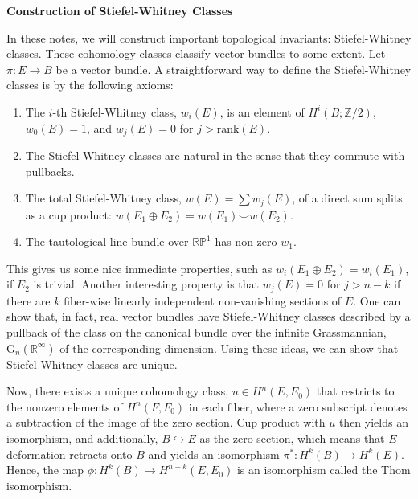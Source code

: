 \documentclass[12pt]{book}
\theoremstyle{definition}
\theoremstyle{remark}
\newcommand{\BR}{\mathbb R}
\newcommand{\BZ}{\mathbb Z}
\newcommand{\rank}{\mathrm{rank}}
\begin{document}
\begin{center}
\textbf{\Large Construction of Stiefel-Whitney Classes}
\end{center}

In these notes, we will construct important topological invariants: Stiefel-Whitney classes. These cohomology classes classify vector bundles to some extent. Let $\pi : E \to B$ be a vector bundle. A straightforward way to define the Stiefel-Whitney classes is by the following axioms:
\begin{enumerate}
\item The $i$-th Stiefel-Whitney class, $w_{i}(E)$, is an element of $H^{i}(B;\BZ/2)$, $w_{0}(E) = 1$, and $w_{j}(E) = 0$ for $j > \rank(E).$
\item The Stiefel-Whitney classes are natural in the sense that they commute with pullbacks.
\item The total Stiefel-Whitney class, $w(E) = \sum w_{j}(E)$, of a direct sum splits as a cup product: $w(E_{1} \oplus E_{2}) = w(E_{1}) \smile w(E_{2}).$
\item The tautological line bundle over $\mathbb{RP}^{1}$ has non-zero $w_{1}.$
\end{enumerate}

This gives us some nice immediate properties, such as $w_{i}(E_{1} \oplus E_{2}) = w_{i}(E_{1})$, if $E_{2}$ is trivial. Another interesting property is that $w_{j}(E) = 0$ for $j > n - k$ if there are $k$ fiber-wise linearly independent non-vanishing sections of $E.$ One can show that, in fact, real vector bundles have Stiefel-Whitney classes described by a pullback of the class on the canonical bundle over the infinite Grassmannian, $\mathrm{G}_{n}(\BR^{\infty})$ of the corresponding dimension. Using these ideas, we can show that Stiefel-Whitney classes are unique.

Now, there exists a unique cohomology class, $u \in H^{n}(E,E_{0})$ that restricts to the nonzero elements of $H^{n}(F,F_{0})$ in each fiber, where a zero subscript denotes a subtraction of the image of the zero section. Cup product with $u$ then yields an isomorphism, and additionally, $B \hookrightarrow E$ as the zero section, which means that $E$ deformation retracts onto $B$ and yields an isomorphism $\pi^{*} : H^{k}(B) \to H^{k}(E).$ Hence, the map $\phi : H^{k}(B) \to H^{n + k}(E,E_{0})$ is an isomorphism called the Thom isomorphism.
\end{document}
